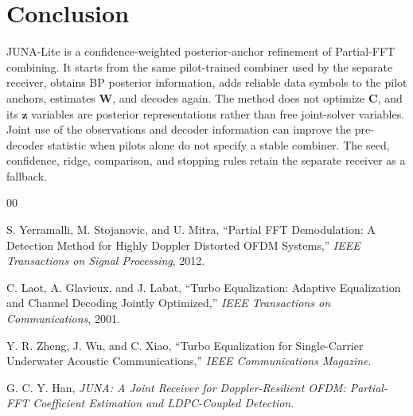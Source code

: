 \documentclass[conference]{IEEEtran}
\begin{document}
\section{Conclusion}

JUNA-Lite is a confidence-weighted posterior-anchor refinement of Partial-FFT
combining.  It starts from the same pilot-trained combiner used by the
separate receiver, obtains BP posterior information, adds reliable data
symbols to the pilot anchors, estimates \(\mathbf W\), and decodes again.  The
method does not optimize \(\mathbf C\), and its \(\mathbf z\) variables are
posterior representations rather than free joint-solver variables.  Joint use
of the observations and decoder information can improve the pre-decoder
statistic when pilots alone do not specify a stable combiner.  The seed,
confidence, ridge, comparison, and stopping rules retain the separate
receiver as a fallback.

\begin{thebibliography}{00}

S. Yerramalli, M. Stojanovic, and U. Mitra,
``Partial FFT Demodulation: A Detection Method for Highly Doppler Distorted
OFDM Systems,''
\emph{IEEE Transactions on Signal Processing}, 2012.

C. Laot, A. Glavieux, and J. Labat,
``Turbo Equalization: Adaptive Equalization and Channel Decoding Jointly
Optimized,''
\emph{IEEE Transactions on Communications}, 2001.

Y. R. Zheng, J. Wu, and C. Xiao,
``Turbo Equalization for Single-Carrier Underwater Acoustic Communications,''
\emph{IEEE Communications Magazine}.

G. C. Y. Han,
\emph{JUNA: A Joint Receiver for Doppler-Resilient OFDM: Partial-FFT
Coefficient Estimation and LDPC-Coupled Detection}.

\end{thebibliography}
\end{document}
